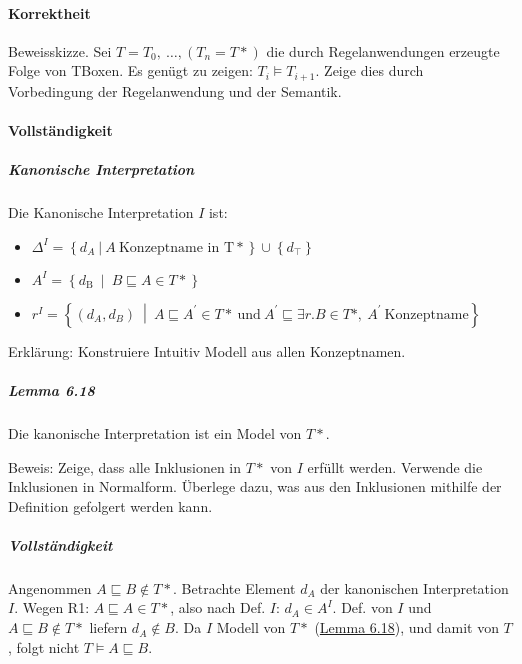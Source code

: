 \paragraph{Korrektheit}\label{korrektheit-1}

Beweisskizze. Sei $T = T_{0},\ \ldots,(T_{n} = T*)$ die durch
Regelanwendungen erzeugte Folge von TBoxen. Es genügt zu zeigen:
$T_{i} \models T_{i + 1}$. Zeige dies durch Vorbedingung der
Regelanwendung und der Semantik.

\paragraph{Vollständigkeit}\label{vollstuxe4ndigkeit-1}

\subparagraph{Kanonische
Interpretation}\label{kanonische-interpretation}

Die Kanonische Interpretation $I$ ist:

\begin{itemize}
\item
  $\Delta^{I} = \left\{ d_{A}\ |\ A\ \mathrm{\text{Konzeptname\ in\ T}}* \right\} \cup \left\{ d_{\top} \right\}$
\item
  $A^{I} = \left\{ d_{\text{B\ }} \middle| \ B \sqsubseteq A \in T* \right\}$
\item
  $r^{I} = \left\{ \left( d_{A},d_{B} \right)\  \middle| \ A \sqsubseteq A^{'} \in T*\ \mathrm{\text{und}}\ A^{'} \sqsubseteq \exists r.B \in T*,\ A^{'}\ \mathrm{\text{Konzeptname}} \right\}$
\end{itemize}

Erklärung: Konstruiere Intuitiv Modell aus allen Konzeptnamen.

\hypertarget{lemma-6.18}{\subparagraph{Lemma 6.18}\label{lemma-6.18}}

Die kanonische Interpretation ist ein Model von $T*$.

Beweis: Zeige, dass alle Inklusionen in $T*$ von $I$ erfüllt werden.
Verwende die Inklusionen in Normalform. Überlege dazu, was aus den
Inklusionen mithilfe der Definition gefolgert werden kann.

\subparagraph{Vollständigkeit}\label{vollstuxe4ndigkeit-2}

Angenommen $A \sqsubseteq B \notin T*$. Betrachte Element $d_{A}$
der kanonischen Interpretation $I$. Wegen R1:
$A \sqsubseteq A \in T*$, also nach Def. $I$: $d_{A} \in A^{I}$.
Def. von $I$ und $A \sqsubseteq B \notin T*$ liefern
$d_{A} \notin B$. Da $I$ Modell von $T*$
(\protect\hyperlink{lemma-6.18}{Lemma 6.18}), und damit von $T$, folgt
nicht $T \models A \sqsubseteq B$.

